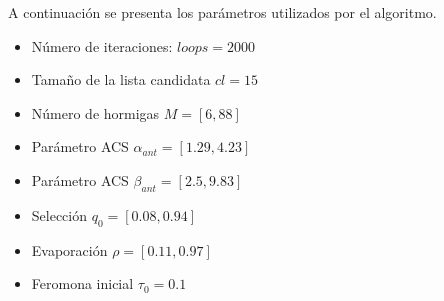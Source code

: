A continuación se presenta los parámetros utilizados por el algoritmo.
\begin{itemize}
\item Número de iteraciones: $loops=2000$
\item Tamaño de la lista candidata $cl=15$
\item Número de hormigas $M=[6,88]$
\item Parámetro ACS $\alpha_{ant}=[1.29, 4.23]$
\item Parámetro ACS $\beta_{ant}=[2.5,9.83]$
\item Selección $q_0=[0.08,0.94]$
\item Evaporación $\rho=[0.11,0.97]$
\item Feromona inicial $\tau_{0}=0.1$
\end{itemize}
